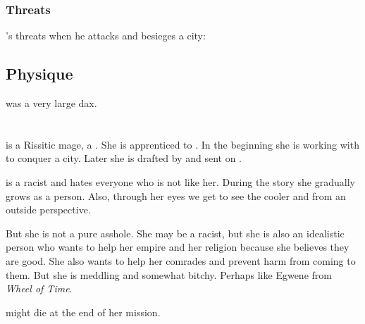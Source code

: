 \subsubsection{Threats}
\Narkiza's threats when he attacks and besieges a city:










\subsection{Physique}
\Narkiza was a very large dax.















\section{\Shilred}
\Shilred{} is a Rissitic mage, a \Shessefkesad. She is apprenticed to \Dzasselid{}. In the beginning she is working with \Dzasselid{} to conquer a \Scyric{} city. Later she is drafted by \Ishna{} and sent on . 

\Shilred{} is a racist and hates everyone who is not like her. During the story she gradually grows as a person. Also, through her eyes we get to see the cooler \Dzasselid{} and \Ishna{} from an outside perspective. 

But she is not a pure asshole. She may be a racist, but she is also an idealistic person who wants to help her empire and her religion because she believes they are good. She also wants to help her comrades and prevent harm from coming to them. But she is meddling and somewhat bitchy. Perhaps like Egwene from \emph{Wheel of Time}. 

\Shilred{} might die at the end of her mission. 









